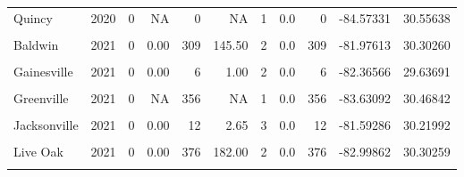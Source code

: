 \documentclass[12pt,final,CPage]{ufthesis}
\begin{document}
{\begin{table}[!h]
{\begin{tabular}[t]{lrrrrrrrrrr}
  Quincy & 2020 & 0 & NA & 0 & NA & 1 & 0.0 & 0 & -84.57331 & 30.55638\\
  \addlinespace
  \cellcolor{gray!6}{Tallahassee} & \cellcolor{gray!6}{2020} & \cellcolor{gray!6}{3364} & \cellcolor{gray!6}{4.82} & \cellcolor{gray!6}{1150} & \cellcolor{gray!6}{0.79} & \cellcolor{gray!6}{157} & \cellcolor{gray!6}{21.4} & \cellcolor{gray!6}{4514} & \cellcolor{gray!6}{-84.30878} & \cellcolor{gray!6}{30.44297}\\
  Baldwin & 2021 & 0 & 0.00 & 309 & 145.50 & 2 & 0.0 & 309 & -81.97613 & 30.30260\\
  \cellcolor{gray!6}{Branford} & \cellcolor{gray!6}{2021} & \cellcolor{gray!6}{0} & \cellcolor{gray!6}{NA} & \cellcolor{gray!6}{12} & \cellcolor{gray!6}{NA} & \cellcolor{gray!6}{1} & \cellcolor{gray!6}{0.0} & \cellcolor{gray!6}{12} & \cellcolor{gray!6}{-82.92316} & \cellcolor{gray!6}{29.95685}\\
  Gainesville & 2021 & 0 & 0.00 & 6 & 1.00 & 2 & 0.0 & 6 & -82.36566 & 29.63691\\
  \cellcolor{gray!6}{Grand Ridge} & \cellcolor{gray!6}{2021} & \cellcolor{gray!6}{0} & \cellcolor{gray!6}{0.00} & \cellcolor{gray!6}{30} & \cellcolor{gray!6}{11.00} & \cellcolor{gray!6}{2} & \cellcolor{gray!6}{0.0} & \cellcolor{gray!6}{30} & \cellcolor{gray!6}{-85.04182} & \cellcolor{gray!6}{30.71944}\\
  \addlinespace
  Greenville & 2021 & 0 & NA & 356 & NA & 1 & 0.0 & 356 & -83.63092 & 30.46842\\
  \cellcolor{gray!6}{Greenwood} & \cellcolor{gray!6}{2021} & \cellcolor{gray!6}{0} & \cellcolor{gray!6}{NA} & \cellcolor{gray!6}{200} & \cellcolor{gray!6}{NA} & \cellcolor{gray!6}{1} & \cellcolor{gray!6}{0.0} & \cellcolor{gray!6}{200} & \cellcolor{gray!6}{-82.57149} & \cellcolor{gray!6}{28.00751}\\
  Jacksonville & 2021 & 0 & 0.00 & 12 & 2.65 & 3 & 0.0 & 12 & -81.59286 & 30.21992\\
  \cellcolor{gray!6}{Lake City} & \cellcolor{gray!6}{2021} & \cellcolor{gray!6}{49} & \cellcolor{gray!6}{9.80} & \cellcolor{gray!6}{472} & \cellcolor{gray!6}{77.72} & \cellcolor{gray!6}{5} & \cellcolor{gray!6}{9.8} & \cellcolor{gray!6}{521} & \cellcolor{gray!6}{-82.67590} & \cellcolor{gray!6}{30.12273}\\
  Live Oak & 2021 & 0 & 0.00 & 376 & 182.00 & 2 & 0.0 & 376 & -82.99862 & 30.30259\\
  \addlinespace
  \cellcolor{gray!6}{Macclenny} & \cellcolor{gray!6}{2021} & \cellcolor{gray!6}{0} & \cellcolor{gray!6}{NA} & \cellcolor{gray!6}{400} & \cellcolor{gray!6}{NA} & \cellcolor{gray!6}{1} & \cellcolor{gray!6}{0.0} & \cellcolor{gray!6}{400} & \cellcolor{gray!6}{-82.11797} & \cellcolor{gray!6}{30.28349}\\

\end{tabular}}
\end{table}}
\end{document}
